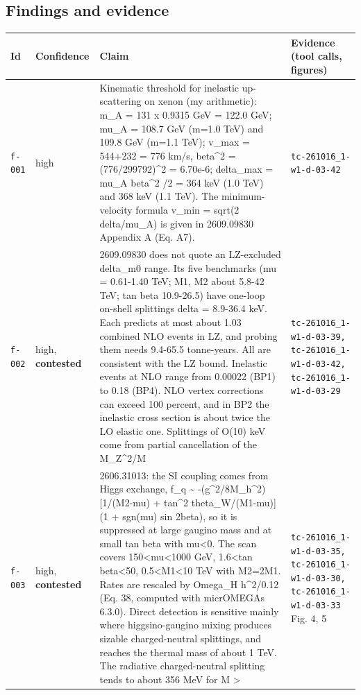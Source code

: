 \documentclass[11pt,a4paper]{article}
\begin{document}
\subsection{Findings and evidence}
\begin{longtable}{@{}p{}p{}p{}p{}@{}}
\toprule Id & Confidence & Claim & Evidence (tool calls, figures) \\ \midrule \endhead
\texttt{f-001} & high & Kinematic threshold for inelastic up-scattering on xenon (my arithmetic): m\_A = 131 x 0.9315 GeV = 122.0 GeV; mu\_A = 108.7 GeV (m=1.0 TeV) and 109.8 GeV (m=1.1 TeV); v\_max = 544+232 = 776 km/s, beta\textasciicircum{}2 = (776/299792)\textasciicircum{}2 = 6.70e-6; delta\_max = mu\_A beta\textasciicircum{}2 /2 = 364 keV (1.0 TeV) and 368 keV (1.1 TeV). The minimum-velocity formula v\_min = sqrt(2 delta/mu\_A) is given in 2609.09830 Appendix A (Eq. A7). & \texttt{tc-261016\_\allowbreak{}1-w1-d-03-42} \\
\texttt{f-002} & high, \textbf{contested} & 2609.09830 does not quote an LZ-excluded delta\_m0 range. Its five benchmarks (\textbar{}mu\textbar{} = 0.61-1.40 TeV; \textbar{}M1\textbar{}, M2 about 5.8-42 TeV; tan beta 10.9-26.5) have one-loop on-shell splittings delta = 8.9-36.4 keV. Each predicts at most about 1.03 combined NLO events in LZ, and probing them needs 9.4-65.5 tonne-years. All are consistent with the LZ bound. Inelastic events at NLO range from 0.00022 (BP1) to 0.18 (BP4). NLO vertex corrections can exceed 100 percent, and in BP2 the inelastic cross section is about twice the LO elastic one. Splittings of O(10) keV come from partial cancellation of the M\_Z\textasciicircum{}2/M & \texttt{tc-261016\_\allowbreak{}1-w1-d-03-39,\allowbreak{} tc-261016\_\allowbreak{}1-w1-d-03-42,\allowbreak{} tc-261016\_\allowbreak{}1-w1-d-03-29} \\
\texttt{f-003} & high, \textbf{contested} & 2606.31013: the SI coupling comes from Higgs exchange, f\_q \textasciitilde{} -(g\textasciicircum{}2/8M\_h\textasciicircum{}2)[1/(M2-\textbar{}mu\textbar{}) + tan\textasciicircum{}2 theta\_W/(M1-\textbar{}mu\textbar{})](1 + sgn(mu) sin 2beta), so it is suppressed at large gaugino mass and at small tan beta with mu\textless{}0. The scan covers 150\textless{}\textbar{}mu\textbar{}\textless{}1000 GeV, 1.6\textless{}tan beta\textless{}50, 0.5\textless{}M1\textless{}10 TeV with M2=2M1. Rates are rescaled by Omega\_H h\textasciicircum{}2/0.12 (Eq. 38, computed with micrOMEGAs 6.3.0). Direct detection is sensitive mainly where higgsino-gaugino mixing produces sizable charged-neutral splittings, and reaches the thermal mass of about 1 TeV. The radiative charged-neutral splitting tends to about 356 MeV for M \textgreater{} & \texttt{tc-261016\_\allowbreak{}1-w1-d-03-35,\allowbreak{} tc-261016\_\allowbreak{}1-w1-d-03-30,\allowbreak{} tc-261016\_\allowbreak{}1-w1-d-03-33} Fig. 4, 5 \\

\end{longtable}
\end{document}
